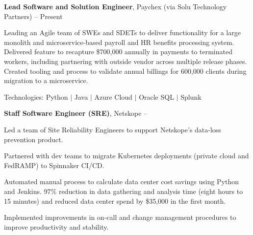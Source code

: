 \documentclass[MMMMyyyy,nonstopmode]{simpleresumecv_stacked}
\newcommand{\tech}[1]{\Gap\textrm{Technologies:} #1}
\begin{document}
\begin{Body}
\Entry
\textbf{Lead Software and Solution Engineer}, Paychex (via Solu Technology Partners)
\hfill
{} -- Present

\Gap
\begin{Detail}
Leading an Agile team of SWEs and SDETs to deliver functionality for a large monolith and microservice-based payroll and HR benefits processing system.
\Gap
\BulletItem
Delivered feature to recapture \$700,000 annually in payments to terminated workers, including partnering with outside vendor across multiple release phases.
\BulletItem
Created tooling and process to validate annual billings for 600,000 clients during migration to a microservice.
\end{Detail}

\tech{Python $|$ Java $|$ Azure Cloud $|$ Oracle SQL $|$ Splunk}

\BigGap

\Entry
\textbf{Staff Software Engineer (SRE)}, Netskope
\hfill
 -- 

\Gap
\begin{Detail}

Led a team of Site Reliability Engineers to support Netskope's data-loss prevention product. 

\Gap

\BulletItem
Partnered with dev teams to migrate Kubernetes deployments (private cloud and FedRAMP) to Spinnaker CI/CD.


\BulletItem
Automated manual process to calculate data center cost savings using Python and Jenkins. 
97\% reduction in data gathering and analysis time (eight hours to 15 minutes) and reduced data center spend by \$35,000 in the first month.


\BulletItem
Implemented improvements in on-call and change management procedures to improve productivity and stability.



\end{Detail}
\end{Body}
\end{document}
